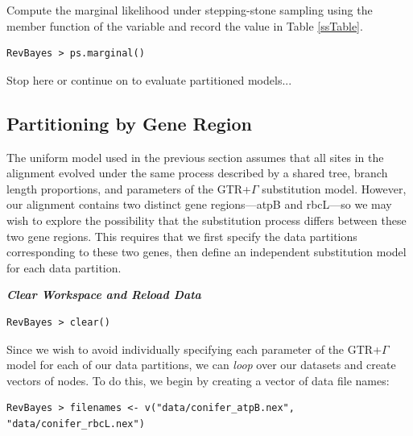Compute the marginal likelihood under stepping-stone sampling using the member function  of the  variable and record the value in Table \ref{ssTable}.
{\tt \begin{snugshade*}
\begin{lstlisting}
RevBayes > ps.marginal() 
\end{lstlisting}
\end{snugshade*}}



\vspace{5mm}

{\begin{framed}
\begin{center}
Stop here or continue on to evaluate partitioned models...
\end{center}
\end{framed}}



\bigskip
\subsection{Partitioning by Gene Region}\label{secByGene}

The uniform model used in the previous section assumes that all sites in the alignment evolved under the same process described by a shared tree, branch length proportions, and parameters of the GTR+$\Gamma$ substitution model.
However, our alignment contains two distinct gene regions---atpB and rbcL---so we may wish to explore the possibility that the substitution process differs between these two gene regions.
This requires that we first specify the data partitions corresponding to these two genes, then define an independent substitution model for each data partition. 

\textbf{\textit{Clear Workspace and Reload Data}}

{\tt \begin{snugshade*}
\begin{lstlisting}
RevBayes > clear()
\end{lstlisting}
\end{snugshade*}}

Since we wish to avoid individually specifying each parameter of the GTR+$\Gamma$ model for each of our data partitions, we can \textit{loop} over our datasets and create vectors of nodes.
To do this, we begin by creating a vector of data file names:
{\tt \begin{snugshade*}
\begin{lstlisting}
RevBayes > filenames <- v("data/conifer_atpB.nex", "data/conifer_rbcL.nex")
\end{lstlisting}
\end{snugshade*}}

